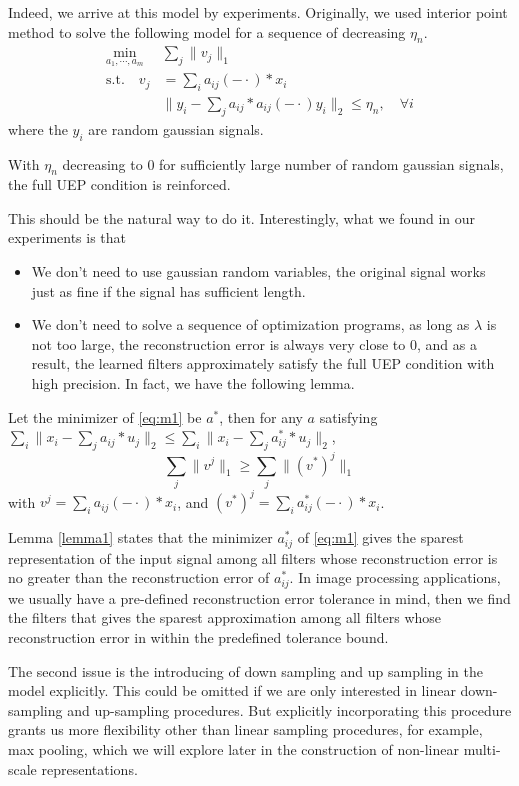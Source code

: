 \documentclass[a4paper]{article}
\begin{document}
Indeed, we arrive at this model by experiments. Originally, we used interior point method to solve the following model for a sequence of decreasing $\eta_n$.
\begin{equation}
\begin{aligned}
	\min_{a_1,\cdots,a_m} & \sum_j\| v_j\|_1  \\
		 \textrm{s.t.}  \quad v_j& = \sum_{i} a_{ij}(-\cdot)*x_i \\
		&\|y_i - \sum_j a_{ij}*a_{ij}(-\cdot)y_i\|_2 \leq \eta_n,\quad  \forall i
	\end{aligned}
\end{equation}
where the $y_i$ are random gaussian signals.

With $\eta_n$ decreasing to $0$ for sufficiently large number of random gaussian signals, the full UEP condition is reinforced. 

This should be the natural way to do it. Interestingly, what we found in our experiments is that
\begin{itemize}
\item We don't need to use gaussian random variables, the original signal works just as fine if the signal has sufficient length. 
\item We don't need to solve a sequence of optimization programs, as long as $\lambda$ is not too large, the reconstruction error is always very close to 0, and as a result, the learned filters approximately satisfy the full UEP condition with high precision. In fact, we have the following lemma.
\end{itemize}
\begin{lem}
\label{lemma1}
Let the minimizer of \eqref{eq:m1} be $a^*$, then for any $a$ satisfying $\sum_i \|x_i - \sum_j a_{ij}*u_j\|_2 \leq \sum_i \|x_i - \sum_j a^*_{ij}*u_j\|_2 $, 
\[
	\sum_j \|v^j\|_1 \geq \sum_j \|(v^*)^j\|_1
\]
with $v^j = \sum_i a_{ij}(-\cdot)*x_i$, and  $(v^*)^j = \sum_i a^*_{ij}(-\cdot)*x_i$.
\end{lem}
Lemma \ref{lemma1} states that the minimizer $a^*_{ij}$ of \eqref{eq:m1} gives the sparest representation of the input signal among all filters whose reconstruction error is no greater than the reconstruction error of $a^*_{ij}$. In image processing applications, we usually have a pre-defined reconstruction error tolerance in mind, then we find the filters that gives the sparest approximation among all filters whose reconstruction error in within the predefined tolerance bound.


The second issue is the introducing of down sampling and up sampling in the model explicitly. This could be omitted if we are only interested in linear down-sampling and up-sampling procedures. But explicitly incorporating this procedure grants us more flexibility other than linear sampling procedures, for example, max pooling, which we will explore later in the construction of non-linear multi-scale representations.
\end{document}
